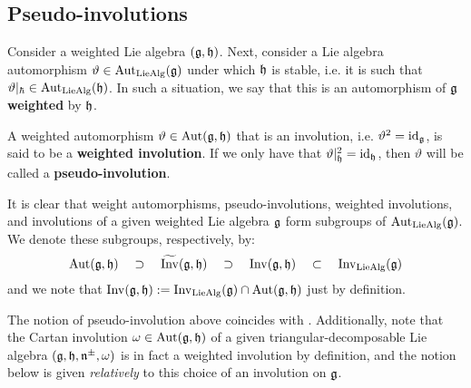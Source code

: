     \subsection{Pseudo-involutions}
        \begin{definition} \label{def: weighted_automorphisms_of_weighted_lie_algebras}
            Consider a weighted Lie algebra $(\mathfrak{g}, \mathfrak{h})$. Next, consider a Lie algebra automorphism $\vartheta \in \operatorname{Aut}_{\mathrm{Lie}\mathrm{Alg}}(\mathfrak{g})$ under which $\mathfrak{h}$ is stable, i.e. it is such that $\vartheta|_{\hbar} \in \operatorname{Aut}_{\mathrm{Lie}\mathrm{Alg}}(\mathfrak{h})$. In such a situation, we say that this is an automorphism of $\mathfrak{g}$ \textbf{weighted} by $\mathfrak{h}$.
            
            A weighted automorphism $\vartheta \in \operatorname{Aut}(\mathfrak{g}, \mathfrak{h})$ that is an involution, i.e. $\vartheta^2 = \mathrm{id}_{\mathfrak{g}}$, is said to be a \textbf{weighted involution}. If we only have that $\vartheta|_{\mathfrak{h}}^2 = \mathrm{id}_{\mathfrak{h}}$, then $\vartheta$ will be called a \textbf{pseudo-involution}. 
        \end{definition}
        It is clear that weight automorphisms, pseudo-involutions, weighted involutions, and involutions of a given weighted Lie algebra $\mathfrak{g}$ form subgroups of $\operatorname{Aut}_{\mathrm{Lie}\mathrm{Alg}}(\mathfrak{g})$. We denote these subgroups, respectively, by:
            $$\operatorname{Aut}(\mathfrak{g}, \mathfrak{h}) \quad \supset \quad \widetilde{\operatorname{Inv}}(\mathfrak{g}, \mathfrak{h}) \quad \supset \quad \operatorname{Inv}(\mathfrak{g}, \mathfrak{h}) \quad \subset \quad \operatorname{Inv}_{\mathrm{Lie}\mathrm{Alg}}(\mathfrak{g})$$
        and we note that $\operatorname{Inv}(\mathfrak{g}, \mathfrak{h}) := \operatorname{Inv}_{\mathrm{Lie}\mathrm{Alg}}(\mathfrak{g}) \cap \operatorname{Aut}(\mathfrak{g}, \mathfrak{h})$ just by definition.
        \begin{remark}
            The notion of pseudo-involution above coincides with \cite[Definition 1.1]{regelskis_vlaar_kac_moody_pseudo_symmetric_pairs}. Additionally, note that the Cartan involution $\omega \in \operatorname{Aut}(\mathfrak{g}, \mathfrak{h})$ of a given triangular-decomposable Lie algebra $(\mathfrak{g}, \mathfrak{h}, \mathfrak{n}^{\pm}, \omega)$ is in fact a weighted involution by definition, and the notion below is given \textit{relatively} to this choice of an involution on $\mathfrak{g}$.
        \end{remark}
        
